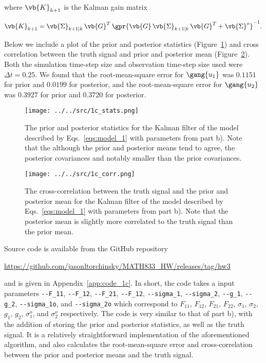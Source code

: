 \begin{enumerate}[a)]
	where $\vb{K}_{k+1}$ is the Kalman gain matrix
	
	\begin{equation}
		\vb{K}_{k+1} = \vb{\Sigma}_{k+1 \vert k}\,\vb{G}^T\,\gpr{\vb{G}\,\vb{\Sigma}_{k+1 \vert k}\,\vb{G}^T + \vb{\Sigma}^{o}}^{-1}.
	\end{equation}
	
	Below we include a plot of the prior and posterior statistics (Figure~\ref{fig:1c_stats}) and cross correlation between the truth signal and prior and posterior mean (Figure~\ref{fig:1c_corr}). Both the simulation time-step size and observation time-step size used were $\Delta t = 0.25$. We found that the root-mean-square error for $\gang{u_1}$ was $0.1151$ for prior and $0.0199$ for posterior, and the root-mean-square error for $\gang{u_2}$ was $0.3927$ for prior and $0.3720$ for posterior.
	
	\begin{figure}[H]
		\centering
		\texttt{[image: ../../src/1c\_stats.png]}
		\caption{The prior and posterior statistics for the Kalman filter of the model described by Eqs.~\ref{eqs:model_1} with parameters from part b). Note that the although the prior and posterior means tend to agree, the posterior covariances and notably smaller than the prior covariances.}
		\label{fig:1c_stats}
	\end{figure}
	
	\begin{figure}[H]
		\centering
		\texttt{[image: ../../src/1c\_corr.png]}
		\caption{The cross-correlation between the truth signal and the prior and posterior mean for the Kalman filter of the model described by Eqs.~\ref{eqs:model_1} with parameters from part b). Note that the posterior mean is slightly more correlated to the truth signal than the prior mean.}
		\label{fig:1c_corr}
	\end{figure}
	
	Source code is available from the GitHub repository
	
	\begin{center}
		\url{https://github.com/jasonltorchinsky/MATH833_HW/releases/tag/hw3}
	\end{center}

	and is given in Appendix~\ref{app:code_1c}. In short, the code takes a input parameters \texttt{-{-}F\_11}, \texttt{-{-}F\_12}, \texttt{-{-}F\_21}, \texttt{-{-}F\_12}, \texttt{-{-}sigma\_1}, \texttt{-{-}sigma\_2}, \texttt{-{-}g\_1}, \texttt{-{-}g\_{2}}, \texttt{-{-}sigma\_1o}, and \texttt{-{-}sigma\_2o} which correspond to $F_{11}$, $F_{12}$, $F_{21}$, $F_{22}$, $\sigma_1$, $\sigma_2$, $g_1$, $g_2$, $\sigma_1^{o}$, and $\sigma_2^{o}$ respectively. The code is very similar to that of part b), with the addition of storing the prior and posterior statistics, as well as the truth signal. It is a relatively straightforward implementation of the aforementioned algorithm, and also calculates the root-mean-square error and cross-correlation between the prior and posterior means and the truth signal.
	

\end{enumerate}
